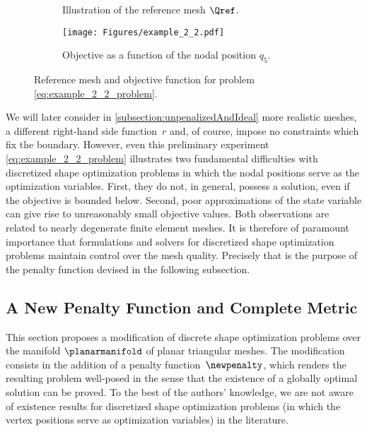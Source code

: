 \begin{figure}[htp]
	\begin{subfigure}[t]{0.40\textwidth}
		\centering
		\caption{Illustration of the reference mesh $\Qref$.}
		\label{fig:mesh_example_no_solutions}
	\end{subfigure}
	\hfill
	\begin{subfigure}[t]{0.55\textwidth}
		\centering
		\texttt{[image: Figures/example\_2\_2.pdf]}
		\caption{Objective as a function of the nodal position $q_5$.}
		\label{fig:objective_function_example_no_solutions}
	\end{subfigure}
	\caption{Reference mesh and objective function for problem \eqref{eq:example_2_2_problem}.}
	\label{fig:example_no_solutions}
\end{figure}

We will later consider in \cref{subsection:unpenalizedAndIdeal} more realistic meshes, a different right-hand side function~$r$ and, of course, impose no constraints which fix the boundary.
However, even this preliminary experiment \eqref{eq:example_2_2_problem} illustrates two fundamental difficulties with discretized shape optimization problems in which the nodal positions serve as the optimization variables.
First, they do not, in general, possess a solution, even if the objective is bounded below.
Second, poor approximations of the state variable can give rise to unreasonably small objective values.
Both observations are related to nearly degenerate finite element meshes.
It is therefore of paramount importance that formulations and solvers for discretized shape optimization problems maintain control over the mesh quality.
Precisely that is the purpose of the penalty function devised in the following subsection.


\subsection{A New Penalty Function and Complete Metric}
\label{subsection:new_penalty_function}

This section proposes a modification of discrete shape optimization problems over the manifold $\planarmanifold$ of planar triangular meshes.
The modification consists in the addition of a penalty function~$\newpenalty$, which renders the resulting problem well-posed in the sense that the existence of a globally optimal solution can be proved.
To the best of the authors' knowledge, we are not aware of existence results for discretized shape optimization problems (in which the vertex positions serve as optimization variables) in the literature.

